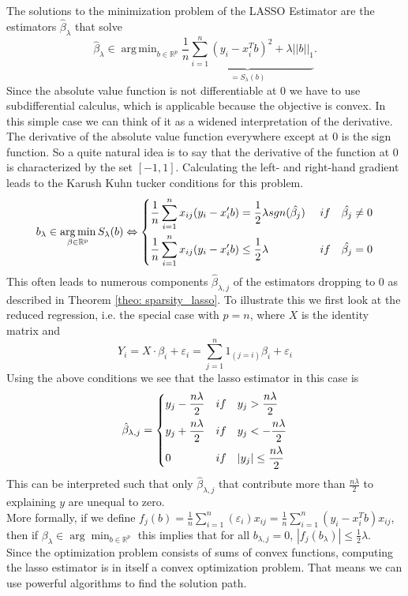 \documentclass{article}
\theoremstyle{definition}
\DeclareMathOperator*{\argmin}{arg\,min}
\begin{document}
The solutions to the minimization problem of the LASSO Estimator are the estimators $\hat\beta_\lambda$ that solve
$$\hat\beta_\lambda \in \argmin_{b\in \mathbb{R}^p}\underbrace{\frac{1}{n}\sum_{i=1}^{n}(y_i-x_i^Tb)^2+\lambda||b||_1}_{=S_\lambda (b)}.$$
%
Since the absolute value function is not differentiable at 0 we have to use subdifferential calculus, which is applicable because the objective is convex. In this simple case we can think of it as a widened interpretation of the derivative. The derivative of the absolute value function everywhere except at 0 is the sign function. So a quite natural idea is to say that the derivative of the function at 0 is characterized by the set $[-1,1]$. Calculating the left- and right-hand gradient leads to the Karush Kuhn tucker conditions for this problem.
\begin{align*}
b_\lambda \in \argmin_{\beta \in\rm \mathbb{R}^p} S_\lambda(b) \Leftrightarrow \begin{dcases} 
\frac{1}{n}\sum_{i=1}^n x_{ij}(y_i-x_i'b)= \frac{1}{2}\lambda sgn(\hat{\beta_{j}}) &\ if \quad \hat{\beta_j} \neq0 \\   
\frac{1}{n}\sum_{i=1}^n x_{ij}(y_i-x_i'b) \leq  \frac{1}{2}\lambda \ &\ if \quad \hat{\beta_j} =0
\end{dcases} 
\end{align*}
This often leads to numerous components $\hat\beta_{\lambda,j}$ of the estimators dropping to 0 as described in Theorem \eqref{theo: sparsity_lasso}. To illustrate this we first look at the reduced regression, i.e. the special case with $p=n$, where $X$ is the identity matrix and
$$Y_i=X \cdot\beta_i+\varepsilon_i=\sum^n_{j=1}1_{(j=i)}\beta_i+\varepsilon_i$$
%
Using the above conditions we see that the lasso estimator in this case is
$$\hat\beta_{\lambda,j}= \begin{dcases} y_j-\frac{n\lambda}{2} &if \quad y_j>\frac{n\lambda}{2}\\
            									  y_j+\frac{n\lambda}{2} &if \quad y_j<-\frac{n\lambda}{2}\\
                                                  0						 &if \quad |y_j|\leq \frac{n\lambda}{2}
\end{dcases}$$
This can be interpreted such that only $\hat\beta_{\lambda,j}$ that contribute more than $\frac{n\lambda}{2}$ to explaining $y$ are unequal to zero.\\ 
More formally, if we define $f_j(b)=\frac{1}{n}\sum^n_{i=1}(\varepsilon_i)x_{ij}=\frac{1}{n}\sum^n_{i=1}(y_i-x_i^Tb)x_{ij}$, then if $\beta_\lambda \in \arg\min_{b\in \mathbb{R}^p}$ this implies that for all $b_{\lambda,j}=0$, $|f_j(b_\lambda)|\leq \frac{1}{2}\lambda$. \\
Since the optimization problem consists of sums of convex functions, computing the lasso estimator is in itself a convex optimization problem. That means we can use powerful algorithms to find the solution path.  \newline
\end{document}
